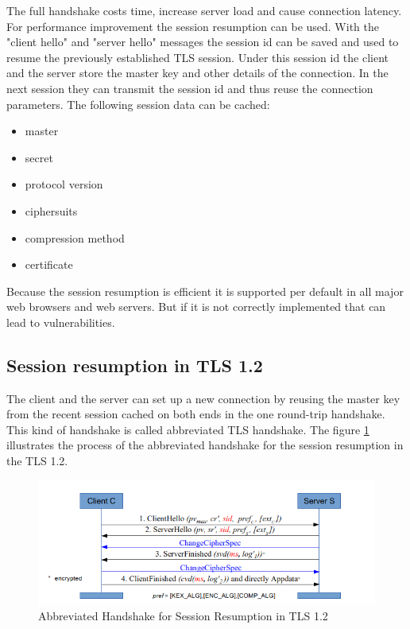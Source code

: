 The full handshake costs time, increase server load and cause connection latency. For performance improvement the session resumption can be used. With the "client hello" and "server hello" messages the session id can be saved and used to resume the previously established TLS session. Under this session id the client and the server store the master key and other details of the connection. In the next session they can transmit the session id and thus reuse the connection parameters. The following session data can be cached:
\begin{itemize}
\item master 
\item secret
\item protocol version
\item ciphersuits
\item compression method
\item certificate
\end{itemize}
Because the session resumption is efficient it is supported per default in all major web browsers and web servers. But if it is not correctly implemented that can lead to vulnerabilities.

\subsection{Session resumption in TLS 1.2}
\label{subsec:resumption1_2}

The client and the server can set up a new connection by reusing the master key from the recent session cached on both ends in the one round-trip handshake. This kind of handshake is called abbreviated TLS handshake. The figure \ref{fig:resumption1_2} illustrates the process of the abbreviated handshake for the session resumption in the TLS 1.2.

\begin{figure}[H]
	\centering
		\includegraphics[scale=0.85]{images/resumption1_2.png}
	\caption{Abbreviated Handshake for Session Resumption in TLS 1.2 \cite{Hassenstein}}
	\label{fig:resumption1_2}
\end{figure}

